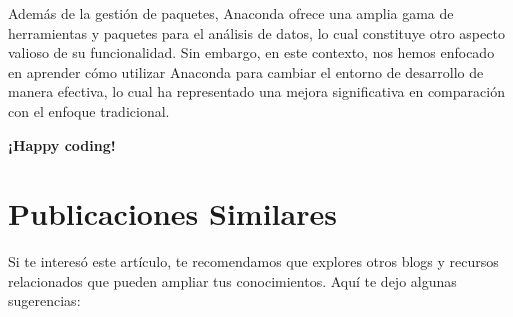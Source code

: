 \documentclass[
  jou,
  floatsintext,
  longtable,
  a4paper,
  nolmodern,
  notxfonts,
  notimes,
  colorlinks=true,linkcolor=blue,citecolor=blue,urlcolor=blue]{apa7}
\begin{document}
Además de la gestión de paquetes, Anaconda ofrece una amplia gama de
herramientas y paquetes para el análisis de datos, lo cual constituye
otro aspecto valioso de su funcionalidad. Sin embargo, en este contexto,
nos hemos enfocado en aprender cómo utilizar Anaconda para cambiar el
entorno de desarrollo de manera efectiva, lo cual ha representado una
mejora significativa en comparación con el enfoque tradicional.

\textbf{¡Happy coding!}

\section{Publicaciones Similares}\label{publicaciones-similares}

Si te interesó este artículo, te recomendamos que explores otros blogs y
recursos relacionados que pueden ampliar tus conocimientos. Aquí te dejo
algunas sugerencias:
\end{document}
